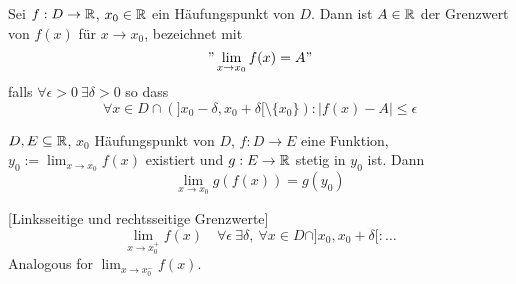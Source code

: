 \begin{definition}{3.49}
    Sei $f: D \to \mathbb{R}$, $x_0 \in \mathbb{R}$ ein Häufungspunkt von $D$. Dann ist $A \in \mathbb{R}$ der Grenzwert von $f(x)$ für $x \to x_0$, bezeichnet mit
    \[ " \lim_{x \to x_0} f(x) = A " \]
    falls $\forall \epsilon > 0\ \exists \delta > 0$ so dass
    \[ \forall x \in D \cap \left(  ]x_0 - \delta, x_0 + \delta[ \setminus \{x_0\}  \right) : |f(x) - A| \le \epsilon \]
\end{definition}

\begin{satz}{3.52}
    $D, E \subseteq \mathbb{R}$, $x_0$ Häufungspunkt von $D$, $f: D \to E$ eine Funktion, $y_0 := \lim_{x \to x_0} f(x)$ existiert und $g: E \to \mathbb{R}$ stetig in $y_0$ ist.
    Dann \[ \lim_{x \to x_0} g(f(x)) = g(y_0) \]
\end{satz}

\begin{definition}{}[Linksseitige und rechtsseitige Grenzwerte]
    \[ \lim_{x \to x_0^+} f(x) \quad \forall \epsilon\ \exists \delta,\ \forall x \in D \cap ]x_0, x_0 + \delta[: \dots \]
    Analogous for $\lim_{x \to x_0^-} f(x)$.
\end{definition}

